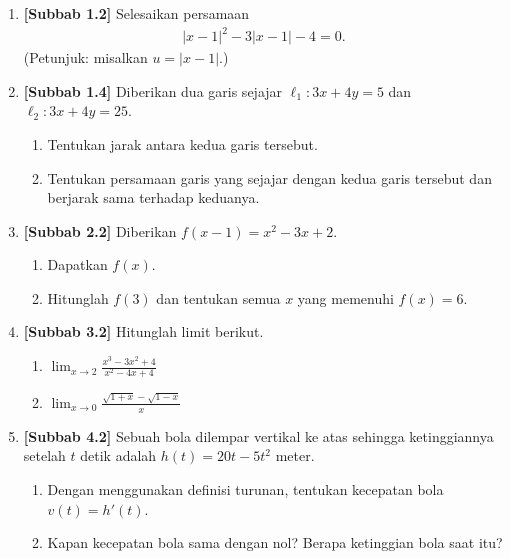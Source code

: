 \documentclass[10pt,openany,a4paper]{article}
\theoremstyle{definition}
\theoremstyle{definition}
\theoremstyle{plain}
\begin{document}
\newpage

\begin{enumerate}
    \item \textbf{[Subbab 1.2]} Selesaikan persamaan
    \begin{align*}
        |x-1|^2-3|x-1|-4=0.
    \end{align*}
    (Petunjuk: misalkan $u=|x-1|$.)

    \item \textbf{[Subbab 1.4]} Diberikan dua garis sejajar $\ell_1: 3x+4y=5$ dan $\ell_2: 3x+4y=25$.
    \begin{enumerate}
        \item Tentukan jarak antara kedua garis tersebut.
        \item Tentukan persamaan garis yang sejajar dengan kedua garis tersebut dan berjarak sama terhadap keduanya.
    \end{enumerate}

    \item \textbf{[Subbab 2.2]} Diberikan $f(x-1)=x^2-3x+2$.
    \begin{enumerate}
        \item Dapatkan $f(x)$.
        \item Hitunglah $f(3)$ dan tentukan semua $x$ yang memenuhi $f(x)=6$.
    \end{enumerate}

    \item \textbf{[Subbab 3.2]} Hitunglah limit berikut.
    \begin{enumerate}
        \item $\displaystyle\lim_{x\to 2}\frac{x^3-3x^2+4}{x^2-4x+4}$
        \item $\displaystyle\lim_{x\to 0}\frac{\sqrt{1+x}-\sqrt{1-x}}{x}$
    \end{enumerate}

    \item \textbf{[Subbab 4.2]} Sebuah bola dilempar vertikal ke atas sehingga ketinggiannya setelah $t$ detik adalah $h(t)=20t-5t^2$ meter.
    \begin{enumerate}
        \item Dengan menggunakan definisi turunan, tentukan kecepatan bola $v(t)=h'(t)$.
        \item Kapan kecepatan bola sama dengan nol? Berapa ketinggian bola saat itu?
    \end{enumerate}
\end{enumerate}
\end{document}
